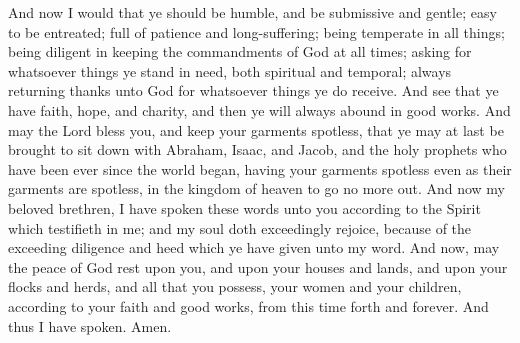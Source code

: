 And now I would that ye should be humble, and be submissive and gentle; easy to be entreated; full of patience and long-suffering; being temperate in all things; being diligent in keeping the commandments of God at all times; asking for whatsoever things ye stand in need, both spiritual and temporal; always returning thanks unto God for whatsoever things ye do receive.
\bverse \iffalse And see that ye have faith, hope, and charity, and then ye will always abound in good works. \fi
And see that ye have faith, hope, and charity, and then ye will always abound in good works.
\bverse \iffalse And may the Lord bless you, and keep your garments spotless, that ye may at last be brought to sit down with Abraham, Isaac, and Jacob, and the holy prophets who have been ever since the world began, having your garments spotless even as their garments are spotless, in the kingdom of heaven to go no more out. \fi
And may the Lord bless you, and keep your garments spotless, that ye may at last be brought to sit down with Abraham, Isaac, and Jacob, and the holy prophets who have been ever since the world began, having your garments spotless even as their garments are spotless, in the kingdom of heaven to go no more out.
\bverse \iffalse And now my beloved brethren, I have spoken these words unto you according to the Spirit which testifieth in me; and my soul doth exceedingly rejoice, because of the exceeding diligence and heed which ye have given unto my word. \fi
And now my beloved brethren, I have spoken these words unto you according to the Spirit which testifieth in me; and my soul doth exceedingly rejoice, because of the exceeding diligence and heed which ye have given unto my word.
\bverse \iffalse And now, may the peace of God rest upon you, and upon your houses and lands, and upon your flocks and herds, and all that you possess, your women and your children, according to your faith and good works, from this time forth and forever. And thus I have spoken. Amen. \fi
And now, may the peace of God rest upon you, and upon your houses and lands, and upon your flocks and herds, and all that you possess, your women and your children, according to your faith and good works, from this time forth and forever. And thus I have spoken. Amen.
\bchapter
\bverse \iffalse And now it came to pass that Alma returned from the land of Gideon, after having taught the people of Gideon many things which cannot be written, having established the order of the church, according as he had before done in the land of Zarahemla, yea, he returned to his own house at Zarahemla to rest himself from the labors which he had performed. \fi
